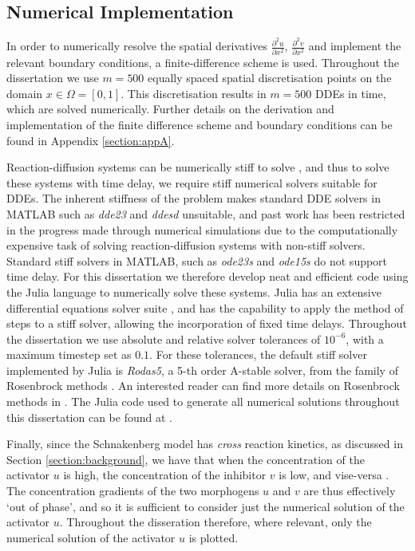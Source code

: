 \subsection{Numerical Implementation}\label{section:numimp}
In order to numerically resolve the spatial derivatives $\frac{\partial^2 u}{\partial x^2}$, $\frac{\partial^2 v}{\partial x^2}$ and implement the relevant boundary conditions, a finite-difference scheme is used. Throughout the dissertation we use $m=500$ equally spaced spatial discretisation points on the domain $x\in\Omega=[0,1]$. This discretisation results in $m=500$ DDEs in time, which are solved numerically. Further details on the derivation and implementation of the finite difference scheme and boundary conditions can be found in Appendix \ref{section:appA}.

Reaction-diffusion systems can be numerically stiff to solve \cite{stiff1, william}, and thus to solve these systems with time delay, we require stiff numerical solvers suitable for DDEs. The inherent stiffness of the problem makes standard DDE solvers in MATLAB such as \emph{dde23} and \emph{ddesd} unsuitable, and past work has been restricted in the progress made through numerical simulations \cite{william} due to the computationally expensive task of solving reaction-diffusion systems with non-stiff solvers. Standard stiff solvers in MATLAB, such as \emph{ode23s} and \emph{ode15s} do not support time delay. For this dissertation we therefore develop neat and efficient code using the Julia language to numerically solve these systems. Julia has an extensive differential equations solver suite \cite{rodas}, and has the capability to apply the method of steps \cite{methsteps} to a stiff solver, allowing the incorporation of fixed time delays. Throughout the dissertation we use absolute and relative solver tolerances of $10^{-6}$, with a maximum timestep set as $0.1$. For these tolerances, the default stiff solver implemented by Julia is \emph{Rodas5}, a 5-th order A-stable solver, from the family of Rosenbrock methods \cite{rodas}. An interested reader can find more details on Rosenbrock methods in \cite{rosenbrock}. The Julia code used to generate all numerical solutions throughout this dissertation can be found at \cite{git}.

Finally, since the Schnakenberg model has \textit{cross} reaction kinetics, as discussed in Section \ref{section:background}, we have that when the concentration of the activator $u$ is high, the concentration of the inhibitor $v$ is low, and vise-versa \cite{murray}. The concentration gradients of the two morphogens $u$ and $v$ are thus effectively `out of phase', and so it is sufficient to consider just the numerical solution of the activator $u$. Throughout the disseration therefore, where relevant, only the numerical solution of the activator $u$ is plotted.
